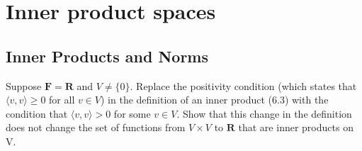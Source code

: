 \chapter{Inner product spaces}

\section{Inner Products and Norms}

\begin{exercise}{3}
Suppose $\mathbf{F} = \mathbf{R}$ and $V \neq \{0\}$. Replace the positivity condition (which states that $\langle v, v \rangle \geq 0$ for all $v \in V$) in the definition of an inner product (6.3) with the condition that $\langle v, v \rangle > 0$ for some $v \in V$. Show that this change in the definition does not change the set of functions from $V \times V$ to $\mathbf{R}$ that are inner products on V.
\end{exercise}

